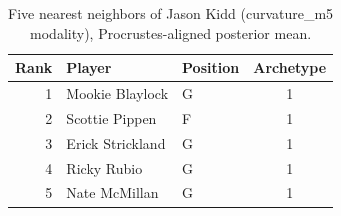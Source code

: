 \begin{table}[htbp]
  \centering\small
  \begin{tabular}{rllc}
    \toprule
    Rank & Player & Position & Archetype \\
    \midrule
    1 & Mookie Blaylock & G & 1 \\
    2 & Scottie Pippen & F & 1 \\
    3 & Erick Strickland & G & 1 \\
    4 & Ricky Rubio & G & 1 \\
    5 & Nate McMillan & G & 1 \\
    \bottomrule
  \end{tabular}
  \caption{Five nearest neighbors of Jason Kidd (curvature_m5 modality), Procrustes-aligned posterior mean.}
  \label{tab:Jason_Kidd_neighbors_curvature_m5}
\end{table}

